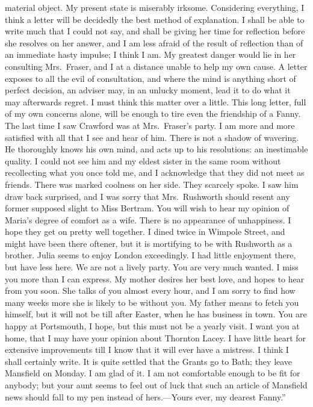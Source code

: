 material object.  My present state is miserably irksome.
Considering everything, I think a letter will be decidedly
the best method of explanation.  I shall be able to write
much that I could not say, and shall be giving her time
for reflection before she resolves on her answer,
and I am less afraid of the result of reflection
than of an immediate hasty impulse; I think I am.
My greatest danger would lie in her consulting Mrs.\ Fraser,
and I at a distance unable to help my own cause.
A letter exposes to all the evil of consultation,
and where the mind is anything short of perfect decision,
an adviser may, in an unlucky moment, lead it to do what it
may afterwards regret.  I must think this matter over
a little.  This long letter, full of my own concerns alone,
will be enough to tire even the friendship of a Fanny.
The last time I saw Crawford was at Mrs.\ Fraser's party.
I am more and more satisfied with all that I see and hear
of him.  There is not a shadow of wavering.  He thoroughly
knows his own mind, and acts up to his resolutions:
an inestimable quality.  I could not see him and my eldest
sister in the same room without recollecting what you
once told me, and I acknowledge that they did not meet
as friends.  There was marked coolness on her side.
They scarcely spoke.  I saw him draw back surprised,
and I was sorry that Mrs.\ Rushworth should resent any
former supposed slight to Miss Bertram.  You will wish
to hear my opinion of Maria's degree of comfort as a wife.
There is no appearance of unhappiness.  I hope they get
on pretty well together.  I dined twice in Wimpole Street,
and might have been there oftener, but it is mortifying
to be with Rushworth as a brother.  Julia seems to enjoy
London exceedingly.  I had little enjoyment there,
but have less here.  We are not a lively party.  You are
very much wanted.  I miss you more than I can express.
My mother desires her best love, and hopes to hear
from you soon.  She talks of you almost every hour,
and I am sorry to find how many weeks more she is likely
to be without you.  My father means to fetch you himself,
but it will not be till after Easter, when he has
business in town.  You are happy at Portsmouth, I hope,
but this must not be a yearly visit.  I want you at home,
that I may have your opinion about Thornton Lacey.
I have little heart for extensive improvements till
I know that it will ever have a mistress.  I think I
shall certainly write.  It is quite settled that the
Grants go to Bath; they leave Mansfield on Monday.
I am glad of it.  I am not comfortable enough to be fit
for anybody; but your aunt seems to feel out of luck
that such an article of Mansfield news should fall
to my pen instead of hers.---Yours ever, my dearest
Fanny.''

